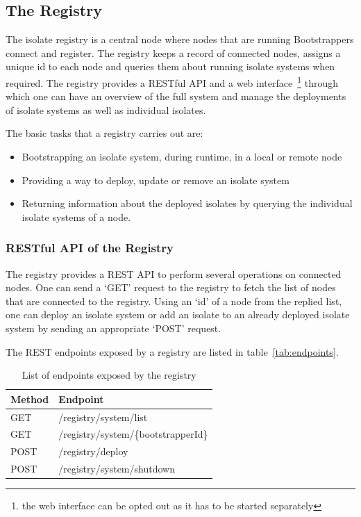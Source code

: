 \subsection{The Registry}
\label{subsec:registry}
The isolate registry is a central node where nodes that are running Bootstrappers connect and register. The registry keeps a record of connected nodes, assigns a unique id to each node and queries them about running isolate systems when required. The registry provides a RESTful API and a web interface~\footnote{the web interface can be opted out as it has to be started separately} through which one can have an overview of the full system and manage the deployments of isolate systems as well as individual isolates.

The basic tasks that a registry carries out are:
\begin{itemize}
  \item Bootstrapping an isolate system, during runtime, in a local or remote node
  \item Providing a way to deploy, update or remove an isolate system
  \item Returning information about the deployed isolates by querying the individual isolate systems of a node.
\end{itemize}

  \subsubsection{RESTful API of the Registry}
  \label{subsec:restApi}
  The registry provides a REST API to perform several operations on connected nodes. One can send a ‘GET’ request to the registry to fetch the list of nodes that are connected to the registry. Using an ‘id’ of a node from the replied list, one can deploy an isolate system or add an isolate to an already deployed isolate system by sending an appropriate ‘POST’ request.

  The REST endpoints exposed by a registry are listed in table~\autoref{tab:endpoints}.
  \begin{table}[H]
    \caption[Endpoints exposed by the registry]{List of endpoints exposed by the registry}\label{tab:endpoints}
    \centering
    \begin{tabular}{l l}
      \toprule
        \bf{Method}  & \bf{Endpoint} \\
      \midrule
        GET &  /registry/system/list\\
        GET & /registry/system/\{bootstrapperId\} \\
        POST & /registry/deploy \\
        POST & /registry/system/shutdown \\
      \bottomrule
    \end{tabular}
  \end{table}

